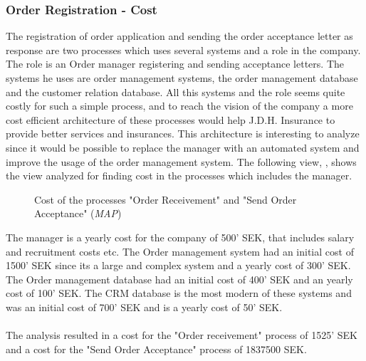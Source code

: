 \subsubsection{Order Registration - Cost}
\label{sec:order_analysis}
The registration of order application and sending the order acceptance letter as response are two processes which uses several systems and a role in the company. The role is an Order manager registering and sending acceptance letters. The systems he uses are order management systems, the order management database and the customer relation database. All this systems and the role seems quite costly for such a simple process, and to reach the vision of the company a more cost efficient architecture of these processes would help J.D.H. Insurance to provide better services and insurances. This architecture is interesting to analyze since it would be possible to replace the manager with an automated system and improve the usage of the order management system. The following view, , shows the view analyzed for finding cost in the processes which includes the manager.
\begin{center}
	\begin{figure}[H]
		\centering
		\setlength\fboxsep{7pt}
		\setlength\fboxrule{0.5pt}
		\caption{Cost of the processes "Order Receivement" and "Send Order Acceptance" (\emph{MAP})}
		\label{fig:map_order_cost}
	\end{figure}
\end{center}
The manager is a yearly cost for the company of 500' SEK, that includes salary and recruitment costs etc. The Order management system had an initial cost of 1500' SEK since its a large and complex system and a yearly cost of 300' SEK. The Order management database had an initial cost of 400' SEK and an yearly cost of 100' SEK. The CRM database is the most modern of these systems and was an initial cost of 700' SEK and is a yearly cost of 50' SEK.\\\\
%
The analysis resulted in a cost for the "Order receivement" process of 1525' SEK and a cost for the "Send Order Acceptance" process of 1837500 SEK.
%

%
